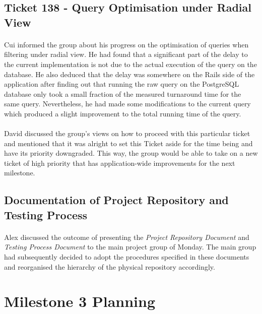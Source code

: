 \documentclass[10pt, a4]{article}
\begin{document}
\subsection{Ticket 138 - Query Optimisation under Radial View}
 
\paragraph{} Cui informed the group about his progress on the
optimisation of queries when filtering under radial view. He had found 
that a significant part of the delay to the current implementation is 
not due to the actual execution of the query on the database. He also
deduced that the delay was somewhere on the Rails side of the application 
after finding out that running the raw query on the PostgreSQL database 
only took a small fraction of the measured turnaround time for the same query. 
Nevertheless, he had made some modifications to the current query which 
produced a slight improvement to the total running time of the query.

\paragraph{} David discussed the group's views on how to proceed with 
this particular ticket and mentioned that it was alright to set this 
Ticket aside for the time being and have its priority downgraded. 
This way, the group would be able to take on a new ticket of high 
priority that has application-wide improvements for the next milestone.


\subsection{Documentation of Project Repository and Testing Process}

\paragraph{} Alex discussed the outcome of presenting the \emph{Project 
Repository Document} and \emph{Testing Process Document} to the main 
project group of Monday. The main group had subsequently decided to 
adopt the procedures specified in these documents and reorganised the
hierarchy of the physical repository accordingly.


\section{Milestone 3 Planning}
\end{document}
